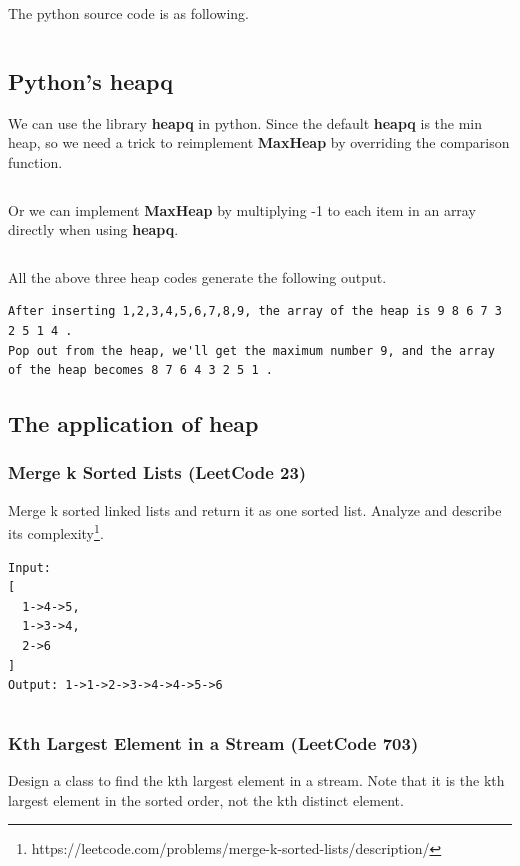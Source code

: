 \documentclass[11pt]{article}
\begin{document}
The python source code is as following.
\inputminted[breaklines=true,frame=leftline, linenos=true]{python}{src/heap.py}

\subsection{Python's heapq}
We can use the library \textbf{heapq} in python. 
Since the default \textbf{heapq} is the min heap, so we need a trick to reimplement \textbf{MaxHeap} by overriding the comparison function. 
\inputminted[breaklines=true,frame=leftline, linenos=true]{python}{src/heap_heapq.py}

Or we can implement \textbf{MaxHeap} by multiplying -1 to each item in an array directly when using \textbf{heapq}.

\inputminted[breaklines=true,frame=leftline, linenos=true]{python}{src/heap_heapq2.py}

All the above three heap codes generate the following output. 
\begin{verbatim}
After inserting 1,2,3,4,5,6,7,8,9, the array of the heap is 9 8 6 7 3 2 5 1 4 .
Pop out from the heap, we'll get the maximum number 9, and the array of the heap becomes 8 7 6 4 3 2 5 1 .
\end{verbatim}

\subsection{The application of heap}
\subsubsection{Merge k Sorted Lists (LeetCode 23)}
Merge k sorted linked lists and return it as one sorted list. Analyze and describe its complexity\footnote{https://leetcode.com/problems/merge-k-sorted-lists/description/}.

\begin{verbatim}
Input:
[
  1->4->5,
  1->3->4,
  2->6
]
Output: 1->1->2->3->4->4->5->6
\end{verbatim}


\inputminted[breaklines=true,frame=leftline, linenos=true]{python}{src/mergeKSortedLists.py}

\subsubsection{Kth Largest Element in a Stream (LeetCode 703)}
Design a class to find the kth largest element in a stream. Note that it is the kth largest element in the sorted order, not the kth distinct element.
\end{document}
